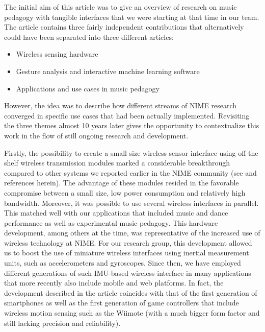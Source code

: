 The initial aim of this article was to give an overview of research on music pedagogy with tangible interfaces that we were starting at that time in our team. The article contains three fairly independent contributions that alternatively could have been separated into three different articles:

\begin{itemize}
\item Wireless sensing hardware
\item Gesture analysis and interactive machine learning software
\item Applications and use cases in music pedagogy
\end{itemize}

However, the idea was to describe how different streams of NIME research converged in specific use cases that had been actually implemented. Revisiting the three themes almost 10 years later gives the opportunity to contextualize this work in the flow of still ongoing research and development.

Firstly, the possibility to create a small size wireless sensor interface using off-the-shelf wireless transmission modules marked a considerable breakthrough compared to other systems we reported earlier in the NIME community (see \cite{Flety:2011} and references herein). The advantage of these modules resided in the favorable compromise between a small size, low power consumption and relatively high bandwidth. Moreover, it was possible to use several wireless interfaces in parallel. This matched well with our applications that included music and dance performance as well as experimental music pedagogy. This hardware development, among others at the time, was representative of the increased use of wireless technology at NIME. For our research group, this development allowed us to boost the use of miniature wireless interfaces using inertial measurement units, such as accelerometers and gyroscopes. Since then, we have employed different generations of such IMU-based wireless interface in many applications that more recently also include mobile and web platforms. In fact, the development described in the article coincides with that of the first generation of smartphones as well as the first generation of game controllers that include wireless motion sensing such as the Wiimote (with a much bigger form factor and still lacking precision and reliability).

